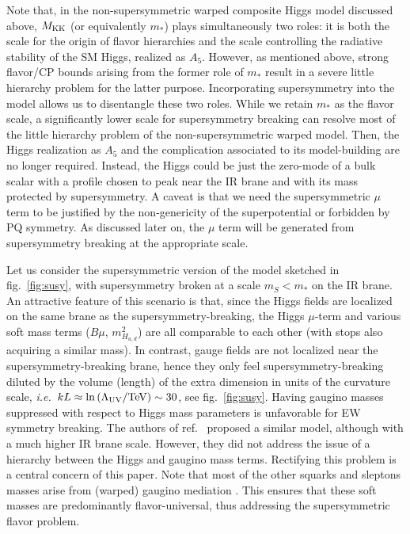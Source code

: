 \documentclass[a4paper,12pt]{article}
\def\fig#1{fig.~\ref{#1}}
\def\fig#1{fig.~\ref{#1}}
\def\LUV{\Lambda_{\rm UV}}
\def\mst{m_*}
\def\mS{m_S}
\begin{document}
Note that, in the non-supersymmetric warped composite Higgs model discussed above, $M_{ \rm KK }$ (or equivalently $\mst$) plays simultaneously two roles: it is both 
the scale for the origin of flavor hierarchies and the scale controlling the radiative stability of the SM Higgs, realized as $A_5$.
However, as mentioned above, strong flavor/CP bounds arising from the former role of $\mst$ result in a severe little hierarchy problem for the latter purpose.
Incorporating supersymmetry into the model allows us to disentangle
these two roles. While we retain $\mst$ as the flavor scale, a significantly lower scale for supersymmetry breaking can resolve most of the little hierarchy problem of the non-supersymmetric warped model.
Then,
the Higgs realization as $A_5$ and the complication associated to its model-building are no longer required. Instead, the Higgs could be just the zero-mode of a bulk scalar with a profile chosen to peak near the IR brane and with its mass protected by supersymmetry.
A caveat is that we need the supersymmetric $\mu$ term to be justified by the non-genericity of the superpotential or forbidden by PQ symmetry. As discussed later on, the $\mu$ term will be generated from supersymmetry breaking at the appropriate scale.

Let us consider the supersymmetric version of the model sketched in \fig{fig:susy}, with supersymmetry broken at a scale $\mS < \mst$ on the IR brane. 
An attractive feature of this scenario is that, since the Higgs fields are localized on the same brane as the supersymmetry-breaking, the Higgs 
$\mu$-term and various soft mass terms ($B \mu$, $m^2_{ H_{ u, d } }$) are all comparable to each other (with stops also acquiring a similar mass).
In contrast, gauge fields are not localized near the supersymmetry-breaking brane, hence they only feel supersymmetry-breaking diluted 
by the volume (length) of the extra dimension in units of the curvature scale, \textit{i.e.}~$k L \approx 
\ln \left( \LUV / \hbox{TeV} \right) \sim 30$, see
\fig{fig:susy}.
Having gaugino masses suppressed with respect to Higgs mass parameters is unfavorable for
EW symmetry breaking.
The authors of ref.~\cite{Okada:2011ed} proposed a similar 
model, although with a much higher IR brane scale. However, they did not address the issue of a hierarchy between the Higgs and gaugino mass terms.
Rectifying this problem is a central concern of this paper.
Note that most of the other squarks and sleptons masses arise from (warped) gaugino mediation \cite{Gherghetta:2000kr}. This ensures that these soft masses are predominantly flavor-universal, thus addressing the supersymmetric flavor problem.
\end{document}
